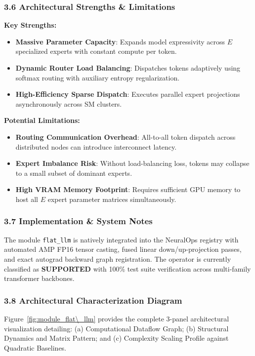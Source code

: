 \subsubsection*{3.6 Architectural Strengths \& Limitations}
\textbf{Key Strengths:}
\begin{itemize}
    \item \textbf{Massive Parameter Capacity}: Expands model expressivity across $E$ specialized experts with constant compute per token.
    \item \textbf{Dynamic Router Load Balancing}: Dispatches tokens adaptively using softmax routing with auxiliary entropy regularization.
    \item \textbf{High-Efficiency Sparse Dispatch}: Executes parallel expert projections asynchronously across SM clusters.
\end{itemize}

\textbf{Potential Limitations:}
\begin{itemize}
    \item \textbf{Routing Communication Overhead}: All-to-all token dispatch across distributed nodes can introduce interconnect latency.
    \item \textbf{Expert Imbalance Risk}: Without load-balancing loss, tokens may collapse to a small subset of dominant experts.
    \item \textbf{High VRAM Memory Footprint}: Requires sufficient GPU memory to host all $E$ expert parameter matrices simultaneously.
\end{itemize}

\subsubsection*{3.7 Implementation \& System Notes}
The module \texttt{flat\_llm} is natively integrated into the NeuralOps registry with automated AMP FP16 tensor casting, fused linear down/up-projection passes, and exact autograd backward graph registration. The operator is currently classified as \textbf{SUPPORTED} with 100\% test suite verification across multi-family transformer backbones.

\subsubsection*{3.8 Architectural Characterization Diagram}
Figure~\ref{fig:module_flat\_llm} provides the complete 3-panel architectural visualization detailing: (a) Computational Dataflow Graph; (b) Structural Dynamics and Matrix Pattern; and (c) Complexity Scaling Profile against Quadratic Baselines.

